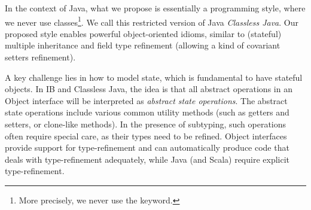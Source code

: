 

In the context of Java, what we propose is essentially a programming
style, where we never use classes\footnote{More precisely, we never
  use the \Q@class@ keyword.}.  We call this restricted version of
Java \emph{Classless Java}.  
Our proposed style enables powerful
object-oriented idioms, similar to (stateful) multiple inheritance and
field type refinement (allowing a kind of covariant setters
refinement).   

A key challenge lies in how to model state, which is fundamental to
have stateful objects. In IB and Classless Java, the idea is that all abstract operations in an Object
interface will be interpreted as \emph{abstract state operations}. The
abstract state operations include various common utility methods (such
as getters and setters, or clone-like methods). In the presence of
subtyping, such operations often require special care, as their types
need to be refined. Object interfaces provide support for
type-refinement and can automatically produce code that deals with
type-refinement adequately, while Java (and Scala) require explicit
type-refinement.





